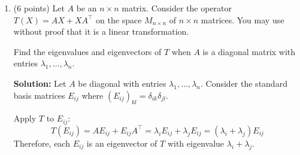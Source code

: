 \documentclass[12pt]{article}
\newcommand{\qspace}{\vspace{1em}} %
\newenvironment{solution}{\noindent\textbf{Solution:} }{\qspace}
\begin{document}
\begin{enumerate}
\begin{enumerate}
        \item (6 points) Find the eigenvalues and corresponding eigenspaces of \( T \). Give the dimensions of the eigenspaces. (Hint: show that \( T^2 \) is the identity on \( M_{n \times n} \). What does this say about the possible eigenvalues of \( T \)?)
        
        \begin{solution}
        First, observe that \( T^2(X) = (X^T)^T = X \), so \( T^2 = I \).

        The minimal polynomial of \( T \) divides \( x^2 - 1 \), so the eigenvalues of \( T \) are \( \lambda = 1 \) and \( \lambda = -1 \).

        - \textbf{Eigenvalue \( \lambda = 1 \):} 
          These are the symmetric matrices since \( T(X) = X \) implies \( X^T = X \).

        - \textbf{Eigenvalue \( \lambda = -1 \):} 
          These are the skew-symmetric matrices since \( T(X) = -X \) implies \( X^T = -X \).

        \textbf{Dimensions:}
        - The space of symmetric \( n \times n \) matrices has dimension \( \frac{n(n+1)}{2} \).
        - The space of skew-symmetric \( n \times n \) matrices has dimension \( \frac{n(n-1)}{2} \).

        Thus, the eigenspaces corresponding to \( \lambda = 1 \) and \( \lambda = -1 \) have dimensions \( \frac{n(n+1)}{2} \) and \( \frac{n(n-1)}{2} \), respectively.
        \end{solution}
    \end{enumerate}
    
    \item (6 points) Let \( A \) be an \( n \times n \) matrix. Consider the operator \( T(X) = AX + XA^\top \) on the space \( M_{n \times n} \) of \( n \times n \) matrices. You may use without proof that it is a linear transformation.
    
    Find the eigenvalues and eigenvectors of \( T \) when \( A \) is a diagonal matrix with entries \( \lambda_1, \dots, \lambda_n \).
    
    \begin{solution}
    Let \( A \) be diagonal with entries \( \lambda_1, \dots, \lambda_n \). Consider the standard basis matrices \( E_{ij} \) where \( (E_{ij})_{kl} = \delta_{ik}\delta_{jl} \).

    Apply \( T \) to \( E_{ij} \):
    \[
    T(E_{ij}) = A E_{ij} + E_{ij} A^\top = \lambda_i E_{ij} + \lambda_j E_{ij} = (\lambda_i + \lambda_j) E_{ij}
    \]
    Therefore, each \( E_{ij} \) is an eigenvector of \( T \) with eigenvalue \( \lambda_i + \lambda_j \).


\end{solution}
\end{enumerate}
\end{document}
